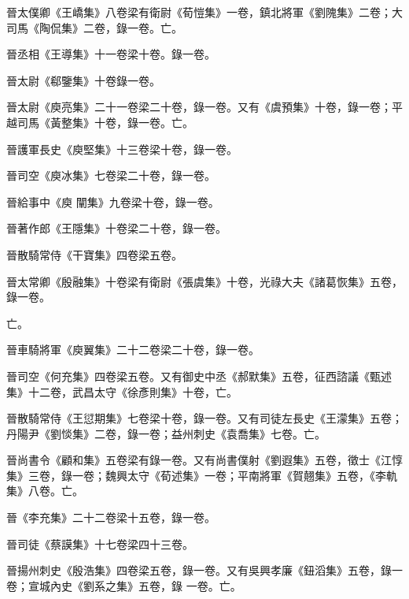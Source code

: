 \begin{pinyinscope}
 晉太僕卿《王嶠集》八卷梁有衛尉《荀愷集》一卷，鎮北將軍《劉隗集》二卷；大司馬《陶侃集》二卷，錄一卷。亡。



 晉丞相《王導集》十一卷梁十卷。錄一卷。



 晉太尉《郗鑒集》十卷錄一卷。



 晉太尉《庾亮集》二十一卷梁二十卷，錄一卷。又有《虞預集》十卷，錄一卷；平越司馬《黃整集》十卷，錄一卷。亡。



 晉護軍長史《庾堅集》十三卷梁十卷，錄一卷。



 晉司空《庾冰集》七卷梁二十卷，錄一卷。



 晉給事中《庾
 闡集》九卷梁十卷，錄一卷。



 晉著作郎《王隱集》十卷梁二十卷，錄一卷。



 晉散騎常侍《干寶集》四卷梁五卷。



 晉太常卿《殷融集》十卷梁有衛尉《張虞集》十卷，光祿大夫《諸葛恢集》五卷，錄一卷。



 亡。



 晉車騎將軍《庾翼集》二十二卷梁二十卷，錄一卷。



 晉司空《何充集》四卷梁五卷。又有御史中丞《郝默集》五卷，征西諮議《甄述集》十二卷，武昌太守《徐彥則集》十卷，亡。



 晉散騎常侍《王愆期集》七卷梁十卷，錄一卷。又有司徒左長史《王濛集》五卷；丹陽尹《劉惔集》二卷，錄一卷；益州刺史《袁喬集》七卷。亡。



 晉尚書令《顧和集》五卷梁有錄一卷。又有尚書僕射《劉遐集》五卷，徵士《江惇集》三卷，錄一卷；魏興太守《荀述集》一卷；平南將軍《賀翹集》五卷，《李軌集》八卷。亡。



 晉《李充集》二十二卷梁十五卷，錄一卷。



 晉司徒《蔡謨集》十七卷梁四十三卷。



 晉揚州刺史《殷浩集》四卷梁五卷，錄一卷。又有吳興孝廉《鈕滔集》五卷，錄一卷；宣城內史《劉系之集》五卷，錄
 一卷。亡。




\end{pinyinscope}
